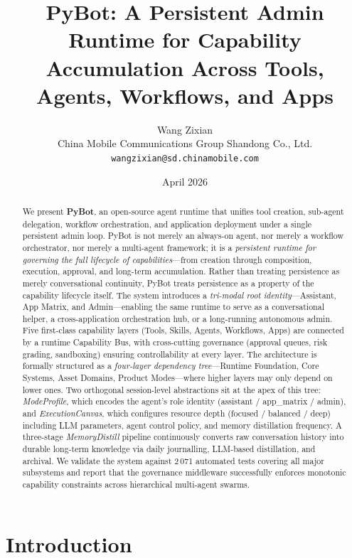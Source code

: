 \documentclass[11pt,a4paper]{article}
\title{%
  \textbf{PyBot: A Persistent Admin Runtime for Capability \\
  Accumulation Across Tools, Agents, Workflows, and Apps}%
}
\author{Wang Zixian\\
China Mobile Communications Group Shandong Co., Ltd.\\
{\tt\small wangzixian@sd.chinamobile.com}
}
\date{April 2026}
\begin{document}
\maketitle

\begin{abstract}
We present \textbf{PyBot}, an open-source agent runtime that unifies tool creation, sub-agent delegation, workflow orchestration, and application deployment under a single persistent admin loop.
PyBot is not merely an always-on agent, nor merely a workflow orchestrator, nor merely a multi-agent framework; it is a \emph{persistent runtime for governing the full lifecycle of capabilities}---from creation through composition, execution, approval, and long-term accumulation.
Rather than treating persistence as merely conversational continuity, PyBot treats persistence as a property of the capability lifecycle itself.
The system introduces a \emph{tri-modal root identity}---Assistant, App Matrix, and Admin---enabling the same runtime to serve as a conversational helper, a cross-application orchestration hub, or a long-running autonomous admin.
Five first-class capability layers (Tools, Skills, Agents, Workflows, Apps) are connected by a runtime Capability Bus, with cross-cutting governance (approval queues, risk grading, sandboxing) ensuring controllability at every layer.
The architecture is formally structured as a \emph{four-layer dependency tree}---Runtime Foundation, Core Systems, Asset Domains, Product Modes---where higher layers may only depend on lower ones.
Two orthogonal session-level abstractions sit at the apex of this tree: \emph{ModeProfile}, which encodes the agent's role identity (assistant / app\_matrix / admin), and \emph{ExecutionCanvas}, which configures resource depth (focused / balanced / deep) including LLM parameters, agent control policy, and memory distillation frequency.
A three-stage \emph{MemoryDistill} pipeline continuously converts raw conversation history into durable long-term knowledge via daily journalling, LLM-based distillation, and archival.
We validate the system against 2\,071 automated tests covering all major subsystems and report that the governance middleware successfully enforces monotonic capability constraints across hierarchical multi-agent swarms.
\end{abstract}

\section{Introduction}
\label{sec:intro}
\end{document}
